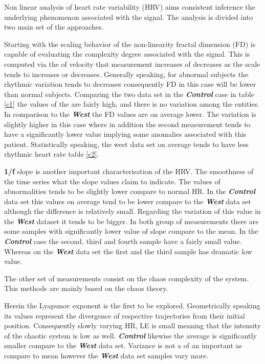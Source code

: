 Non linear analysis of heart rate variability (HRV) aims consistent inference the underlying phenomenon associated with the signal. 
The analysis is divided into two main set of the approaches. 

Starting with the scaling behavior of the non-linearity fractal dimension (FD) is capable of evaluating the complexity degree associated with the signal. This is computed via the of velocity that measurement increases of decreases as the scale tends to increases or decreases. Generally speaking, for abnormal subjects the rhythmic variation tends to decreases consequently FD in this case will be lower than normal subjects. Comparing the two data set in the \textbf{\textit{Control}} case in table \ref{c1} the values of the are fairly high, and there is no variation among the entities. In comparison to the \textbf{\textit{West}} the FD values are on average lower. The variation is slightly higher in this case where in addition the second measurement tends to have a significantly lower value implying some anomalies associated with this patient. Statistically speaking, the west data set on average tends to have less rhythmic heart rate table \ref{c2}.

\textbf{1/f} slope is another important characterisation of the HRV. The smoothness of the time series what the slope values claim to indicate. The values of abnormalities tends to be slightly lower compare to normal HR. In the \textbf{\textit{Control}} data set this values on average tend to be lower compare to the \textbf{\textit{West}} data set although the difference is relatively small. Regarding the variation of this value in the \textbf{\textit{West}} dataset it tends to be bigger. In both group of measurements there are some samples with significantly lower value of slope compare to the mean. In the \textbf{\textit{Control}} case the second, third and fourth sample have a fairly small value. Whereas on the \textbf{\textit{West}} data set the first and the third sample has dramatic low value. 

The other set of measurements consist on the chaos complexity of the system. This methods are mainly based on the chaos theory.

Herein the Lyapunov exponent is the first to be explored. Geometrically speaking  its values represent the divergence of respective trajectories from their initial position. Consequently slowly varying HR, LE is small meaning that the intensity of the chaotic system is low as well. \textbf{\textit{Control}} likewise the average is significantly smaller compare to the \textbf{\textit{West}} data set. Variance is not a of an important as compare to mean however the \textbf{\textit{West}} data set samples vary more. 

